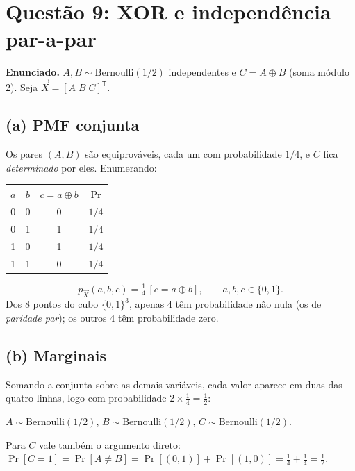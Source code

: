 \documentclass[11pt,a4paper]{article}
\newcommand{\Ind}[1]{\left[#1\right]}
\renewcommand{\Pr}{\operatorname{Pr}}
\begin{document}
\clearpage
\section{Questão 9: XOR e independência par-a-par}

\textbf{Enunciado.} $A,B\sim\text{Bernoulli}(1/2)$ independentes e
$C=A\oplus B$ (soma módulo 2). Seja $\vec X=[A\;B\;C]^{\mathsf T}$.

\subsection*{(a) PMF conjunta}

Os pares $(A,B)$ são equiprováveis, cada um com probabilidade $1/4$, e $C$ fica
\emph{determinado} por eles. Enumerando:

\begin{center}
\begin{tabular}{cccc}
\toprule
$a$ & $b$ & $c=a\oplus b$ & $\Pr$ \\
\midrule
0 & 0 & 0 & $1/4$ \\
0 & 1 & 1 & $1/4$ \\
1 & 0 & 1 & $1/4$ \\
1 & 1 & 0 & $1/4$ \\
\bottomrule
\end{tabular}
\end{center}

\begin{resp}
\[
p_{\vec X}(a,b,c)=\tfrac14\,\Ind{c=a\oplus b},\qquad a,b,c\in\{0,1\}.
\]
Dos $8$ pontos do cubo $\{0,1\}^3$, apenas $4$ têm probabilidade não nula (os de
\emph{paridade par}); os outros $4$ têm probabilidade zero.
\end{resp}

\subsection*{(b) Marginais}

Somando a conjunta sobre as demais variáveis, cada valor aparece em duas das
quatro linhas, logo com probabilidade $2\times\frac14=\frac12$:

\begin{resp}
$A\sim\text{Bernoulli}(1/2)$, \quad $B\sim\text{Bernoulli}(1/2)$, \quad
$C\sim\text{Bernoulli}(1/2)$.
\end{resp}

Para $C$ vale também o argumento direto:
$\Pr[C=1]=\Pr[A\ne B]=\Pr[(0,1)]+\Pr[(1,0)]=\tfrac14+\tfrac14=\tfrac12$.
\end{document}
